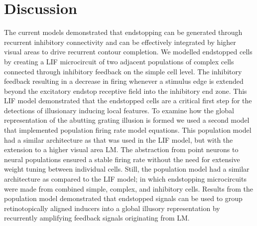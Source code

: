 \documentclass[12pt]{article}
\begin{document}
\section*{Discussion}
\setlength{\parindent}{12pt}  
The current models demonstrated that endstopping can be generated through recurrent inhibitory connectivity and can be effectively integrated by higher visual areas to drive recurrent contour completion. We modelled endstopped cells by creating a LIF microcircuit of two adjacent populations of complex cells connected through inhibitory feedback on the simple cell level. The inhibitory feedback resulting in a decrease in firing whenever a stimulus edge is extended beyond the excitatory endstop receptive field into the inhibitory end zone. This LIF model demonstrated that the endstopped cells are a critical first step for the detections of illusionary inducing local features. To examine how the global representation of the abutting grating illusion is formed we used a second model that implemented population firing rate model equations. This population model had a similar architecture as that was used in the LIF model, but with the extension to a higher visual area LM. The abstraction from point neurons to neural populations ensured a stable firing rate without the need for extensive weight tuning between individual cells. Still, the population model had a similar architecture as compared to the LIF model; in which endstopping microcircuits were made from combined simple, complex, and inhibitory cells. Results from the population model demonstrated that endstopped signals can be used to group retinotopically aligned inducers into a global illusory representation by recurrently amplifying feedback signals originating from LM. 
\setlength{\parindent}{0pt}
\bigbreak
\end{document}
